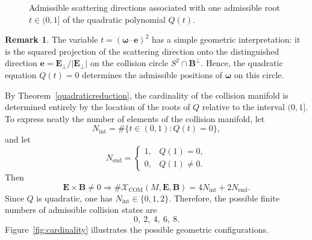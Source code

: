\documentclass[12pt]{article}
\theoremstyle{plain}
\theoremstyle{definition}
\newtheorem{remark}[theorem]{Remark}
\newcommand{\R}{\mathbb{R}}
\begin{document}
\begin{figure}[ht!]

\caption{Admissible scattering directions associated with one admissible root $t\in (0,1]$ of the quadratic polynomial $Q(t)$.}
\label{fig:vectors}
\end{figure}

\begin{remark}
The variable $t=({\bm\omega}\cdot{\bm e})^2$
has a simple geometric interpretation: it is the squared projection of the scattering direction onto the distinguished direction ${\bm e}={\bm E}_{\perp}/|{\bm E}_{\perp}|$
on the collision circle $S^2\cap{\bm B}^{\perp}$. Hence, the quadratic equation $Q(t)=0$ determines the admissible positions of ${\bm\omega}$ on this circle.
\end{remark}
By Theorem~\ref{quadraticreduction}, the cardinality of the collision manifold is determined entirely by the location of the roots of $Q$ relative to the interval $(0,1]$.
To express neatly the number of elements of the collision manifold,
let
\[
N_{\mathrm{int}}=\#\{t\in(0,1):Q(t)=0\},
\]
and let
\[
N_{\mathrm{end}}=
\begin{cases}
1, & Q(1)=0,\\
0, & Q(1)\neq0.
\end{cases}
\]
Then 
\[
{\bm E}\times{\bm B}\neq0 \Rightarrow \# \mathcal{X}_\mathrm{COM}(M,{\bm E}, {\bm B})= 4N_{\mathrm{int}}+2N_{\mathrm{end}}.
\]
Since $Q$ is quadratic, one has $N_{\mathrm{int}}\in\{0,1,2\}$.
Therefore, the possible finite numbers of admissible collision states are
\[
0,\ 2,\ 4,\ 6,\ 8.
\]
Figure~\ref{fig:cardinality} illustrates the possible geometric configurations.
\end{document}
